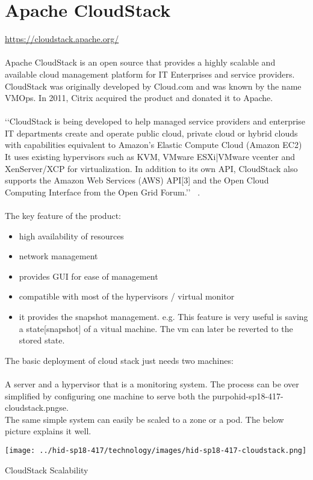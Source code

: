 
\section{Apache CloudStack}
\url{ https://cloudstack.apache.org/} \\
\\
Apache CloudStack is an open source that provides a highly scalable and available 
cloud management platform for IT
Enterprises and service providers. CloudStack was originally developed by Cloud.com and was known by the name VMOps. 
In 2011, Citrix acquired the product and donated it to Apache. \\
\\
‘‘CloudStack is being developed to help managed service providers and enterprise IT 
departments create and operate public cloud, private cloud or hybrid clouds
with capabilities equivalent to Amazon's Elastic Compute Cloud (Amazon EC2)
It uses existing hypervisors such as KVM, VMware ESXi|VMware vcenter and
XenServer/XCP for virtualization. In addition to its own API, CloudStack 
also supports the Amazon Web Services (AWS) API[3] and the Open Cloud Computing Interface from the Open Grid Forum.’’  
~\cite{ hid-sp18-417-wiki-cloudStack}. 
\\
\\
The key feature of the product:
\begin{itemize}
\item        high availability of resources
\item        network management
\item        provides GUI for ease of management
\item        compatible with most of the hypervisors / virtual monitor
\item        it provides the snapshot management. e.g. This feature is 
very useful is saving a state[snapshot] of a vitual machine. 
The vm can later be reverted to the stored state.  
\end{itemize}
 The basic deployment of cloud stack just needs two machines: \\
 \\
 A server and a hypervisor that is a monitoring system. 
 The process can be over simplified by configuring one machine 
 to serve both the purpohid-sp18-417-cloudstack.pngse. \\
 The same simple system can easily be scaled to a zone or a pod.
 The below picture explains it well.

 \texttt{[image: ../hid-sp18-417/technology/images/hid-sp18-417-cloudstack.png]}

\begin{center}
CloudStack Scalability ~\cite{hid-sp18-417-cloudstack-scaling} 
\end{center}


